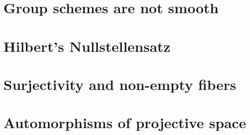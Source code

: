 \documentclass{../util/zariski}
\begin{document}
\section{Group schemes are not smooth}


\section{Hilbert's Nullstellensatz}


\section{Surjectivity and non-empty fibers}


\section{Automorphisms of projective space}


\printindex

\printbibliography
\end{document}
